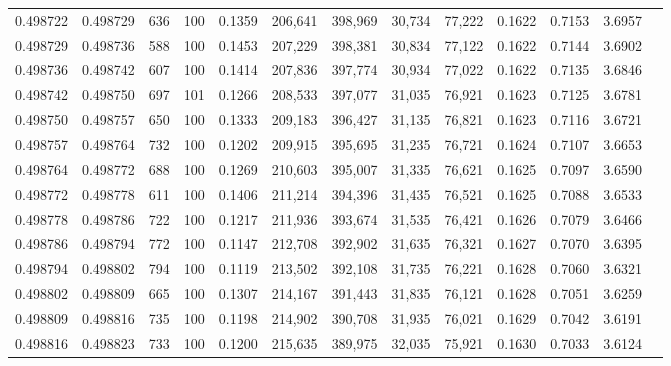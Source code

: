 \begin{tabular}{rrrrrrrrrrrrr}
0.498722 & 0.498729 &   636 & 100 &                                     0.1359 & 206,641 & 398,969 &  30,734 &  77,222 & 0.1622 & 0.7153 & 3.6957 \\
0.498729 & 0.498736 &   588 & 100 &                                     0.1453 & 207,229 & 398,381 &  30,834 &  77,122 & 0.1622 & 0.7144 & 3.6902 \\
0.498736 & 0.498742 &   607 & 100 &                                     0.1414 & 207,836 & 397,774 &  30,934 &  77,022 & 0.1622 & 0.7135 & 3.6846 \\
0.498742 & 0.498750 &   697 & 101 &                                     0.1266 & 208,533 & 397,077 &  31,035 &  76,921 & 0.1623 & 0.7125 & 3.6781 \\
0.498750 & 0.498757 &   650 & 100 &                                     0.1333 & 209,183 & 396,427 &  31,135 &  76,821 & 0.1623 & 0.7116 & 3.6721 \\
0.498757 & 0.498764 &   732 & 100 &                                     0.1202 & 209,915 & 395,695 &  31,235 &  76,721 & 0.1624 & 0.7107 & 3.6653 \\
0.498764 & 0.498772 &   688 & 100 &                                     0.1269 & 210,603 & 395,007 &  31,335 &  76,621 & 0.1625 & 0.7097 & 3.6590 \\
0.498772 & 0.498778 &   611 & 100 &                                     0.1406 & 211,214 & 394,396 &  31,435 &  76,521 & 0.1625 & 0.7088 & 3.6533 \\
0.498778 & 0.498786 &   722 & 100 &                                     0.1217 & 211,936 & 393,674 &  31,535 &  76,421 & 0.1626 & 0.7079 & 3.6466 \\
0.498786 & 0.498794 &   772 & 100 &                                     0.1147 & 212,708 & 392,902 &  31,635 &  76,321 & 0.1627 & 0.7070 & 3.6395 \\
0.498794 & 0.498802 &   794 & 100 &                                     0.1119 & 213,502 & 392,108 &  31,735 &  76,221 & 0.1628 & 0.7060 & 3.6321 \\
0.498802 & 0.498809 &   665 & 100 &                                     0.1307 & 214,167 & 391,443 &  31,835 &  76,121 & 0.1628 & 0.7051 & 3.6259 \\
0.498809 & 0.498816 &   735 & 100 &                                     0.1198 & 214,902 & 390,708 &  31,935 &  76,021 & 0.1629 & 0.7042 & 3.6191 \\
0.498816 & 0.498823 &   733 & 100 &                                     0.1200 & 215,635 & 389,975 &  32,035 &  75,921 & 0.1630 & 0.7033 & 3.6124 \\

\end{tabular}
